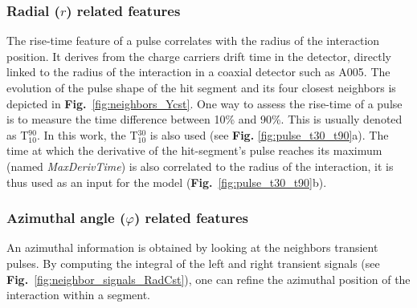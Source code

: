 \subsubsection{Radial ($r$) related features}
The rise-time feature of a pulse correlates with the radius of the interaction position. It derives from the charge carriers drift time in the detector, directly linked to the radius of the interaction in a coaxial detector such as A005. The evolution of the pulse shape of the hit segment and its four closest neighbors is depicted in \textbf{Fig.}~\ref{fig:neighbors_Ycst}. One way to assess the rise-time of a pulse is to measure the time difference between 10\% and 90\%. This is usually denoted as T$^{90}_{10}$. In this work, the T$^{30}_{10}$ is also used (see \textbf{Fig.} \ref{fig:pulse_t30_t90}a).
The time at which the derivative of the hit-segment's pulse reaches its maximum (named \textit{MaxDerivTime}) is also correlated to the radius of the interaction, it is thus used as an input for the model (\textbf{Fig.}~\ref{fig:pulse_t30_t90}b).

\subsubsection{Azimuthal angle ($\varphi$) related features}
An azimuthal information is obtained by looking at the neighbors transient pulses. By computing the integral of the left and right transient signals (see \textbf{Fig.}~\ref{fig:neighbor_signals_RadCst}), one can refine the azimuthal position of the interaction within a segment.

